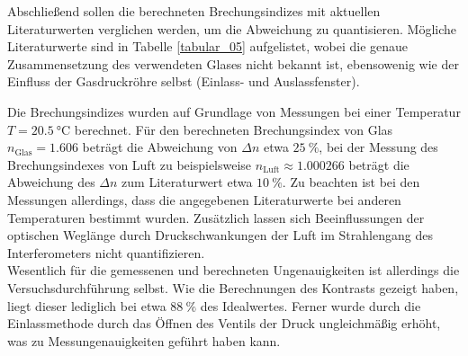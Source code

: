 Abschließend sollen die berechneten Brechungsindizes mit aktuellen
Literaturwerten verglichen werden, um die Abweichung zu quantisieren. Mögliche
Literaturwerte sind in Tabelle \ref{tabular_05} aufgelistet, wobei die genaue
Zusammensetzung des verwendeten Glases nicht bekannt ist, ebensowenig wie der
Einfluss der Gasdruckröhre selbst (Einlass- und Auslassfenster). \\
\FloatBarrier

\FloatBarrier
\noindent Die Brechungsindizes wurden auf Grundlage von Messungen bei
einer Temperatur $T = \SI{20.5}{\celsius}$ berechnet. Für den
berechneten Brechungsindex von Glas $n_\text{Glas} = \num{1.606}$ beträgt
die Abweichung von $\Delta n$ etwa $\SI{25}{\percent}$, bei der Messung des Brechungsindexes
von Luft zu beispielsweise $n_\text{Luft} \approx \num{1.000266}$ beträgt die
Abweichung des $\Delta n$ zum Literaturwert etwa $\SI{10}{\percent}$. Zu beachten ist bei den
Messungen allerdings, dass die angegebenen Literaturwerte bei anderen
Temperaturen bestimmt wurden. Zusätzlich lassen sich Beeinflussungen der
optischen Weglänge durch Druckschwankungen der Luft im Strahlengang des
Interferometers nicht quantifizieren. \\
\noindent Wesentlich für die gemessenen und berechneten Ungenauigkeiten ist
allerdings die Versuchsdurchführung selbst. Wie die Berechnungen des Kontrasts
gezeigt haben, liegt dieser lediglich bei etwa $\SI{88}{\percent}$ des
Idealwertes. Ferner wurde durch die Einlassmethode durch das Öffnen des Ventils
der Druck ungleichmäßig erhöht, was zu Messungenauigkeiten geführt haben kann.

